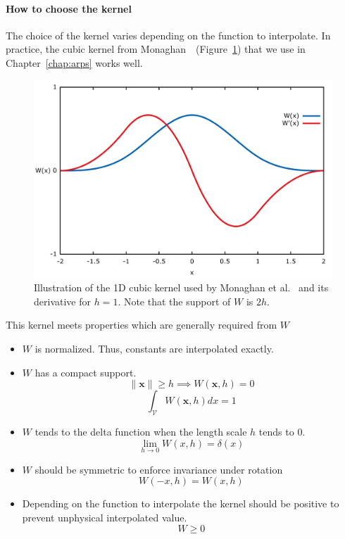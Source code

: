 \paragraph{How to choose the kernel}
The choice of the kernel varies depending on the function to interpolate. In practice, the cubic kernel from Monaghan~\cite{Monaghan1992}~(Figure~\ref{fig:cubicKernel}) that we use in Chapter~\ref{chap:arps} works well.
\begin{figure}[!h]
	\centering
	\includegraphics[width=\linewidth]{images/continuum_mechanics/cubicKernel.png}
	\caption[STAR mechanics: Cubic kernel]{\label{fig:cubicKernel}
		Illustration of the 1D cubic kernel used by Monaghan et al.~\cite{Monaghan1992} and its derivative for $h=1$. Note that the support of $W$ is $2h$.}
\end{figure}
This kernel meets properties which are generally required from $W$
\begin{itemize}
\item $W$ is normalized. Thus, constants are interpolated exactly.
\item $W$ has a compact support.
\begin{equation}
\parallel \mathbf{x} \parallel \geq h \implies W(\mathbf{x},h) = 0 
\end{equation}
\begin{equation}
\int_{\mathcal{V}} W(\mathbf{x},h) dx = 1
\end{equation}
\item $W$ tends to the delta function when the length scale $h$ tends to $0$.
\begin{equation}
\lim_{h \rightarrow 0} W(x,h) = \delta(x)
\end{equation}
\item $W$ should be symmetric to enforce invariance under rotation
\begin{equation}
W(-x,h) = W(x,h)
\end{equation}
\item Depending on the function to interpolate the kernel should be positive to prevent unphysical interpolated value.
\begin{equation}
W \geq 0
\end{equation}
\end{itemize}
